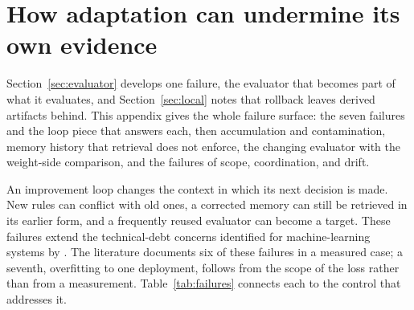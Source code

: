 \section{How adaptation can undermine its own evidence}\label{app:failure}

Section~\ref{sec:evaluator} develops one failure, the evaluator that becomes part of what it evaluates, and Section~\ref{sec:local} notes that rollback leaves derived artifacts behind. This appendix gives the whole failure surface: the seven failures and the loop piece that answers each, then accumulation and contamination, memory history that retrieval does not enforce, the changing evaluator with the weight-side comparison, and the failures of scope, coordination, and drift.

An improvement loop changes the context in which its next decision is made. New rules can conflict with old ones, a corrected memory can still be retrieved in its earlier form, and a frequently reused evaluator can become a target. These failures extend the technical-debt concerns identified for machine-learning systems by \citet{sculley2015debt}. The literature documents six of these failures in a measured case; a seventh, overfitting to one deployment, follows from the scope of the loss rather than from a measurement. Table~\ref{tab:failures} connects each to the control that addresses it.

